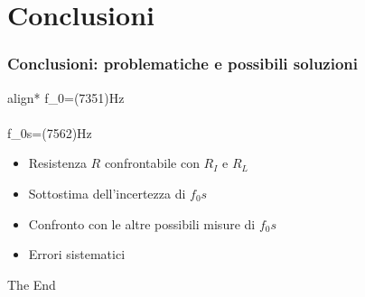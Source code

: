 \documentclass[
	11pt, %
]{beamer}
\begin{document}

\section{Conclusioni}

\begin{frame}[t]
	\frametitle{Conclusioni: problematiche e possibili soluzioni}

	\begin{empheq}[box=\tcbhighmath]{align*}
		f_0=(7351)Hz\\ \\
		f_0s=(7562)Hz
			\end{empheq}
			\vspace{0.5cm}
	\begin{itemize}
		\item Resistenza $R$ confrontabile con $R_I$ e $R_L$ \vspace{0.5cm}
		\item Sottostima dell'incertezza di $f_0s$ \vspace{0.5cm}
		\item Confronto con le altre possibili misure di $f_0s$ \vspace{0.5cm}
		\item Errori sistematici
	\end{itemize}
\end{frame}














\begin{frame}[plain] %
	\begin{center}
		{\Huge The End}
		
		\bigskip\bigskip %
		
		{\LARGE }
	\end{center}
\end{frame}

\end{document}
